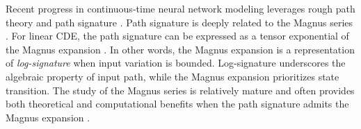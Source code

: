 Recent progress in continuous-time neural network modeling leverages
rough path theory and path signature \cite{muca2024theoretical, walker2024log, walker2025structured}.
Path signature is deeply related to the Magnus series \cite{chevyrev2024multiplicative,chevyrev2025primer}.
For linear CDE, the path signature can be expressed as
a tensor exponential of the Magnus expansion \cite{friz2022unified}.
In other words, the Magnus expansion is a representation of \emph{log-signature} \cite{morrill2021neural, walker2024log}
when input variation is bounded.
Log-signature underscores the algebraic property of input path,
while the Magnus expansion prioritizes state transition.
The study of the Magnus series is relatively mature and often provides both theoretical and computational benefits
when the path signature admits the Magnus expansion \cite{friz2022unified}.